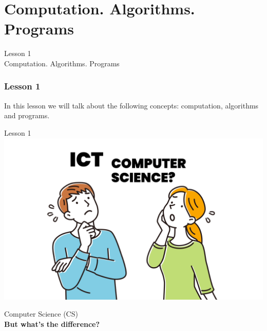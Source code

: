 \documentclass[aspectratio=1610]{beamer}
\begin{document}
\section{Computation. Algorithms. Programs}

\begin{frame}
\begin{center}
\Huge Lesson 1\\
Computation. Algorithms. Programs
\end{center}
\end{frame}


\begin{frame}
\frametitle{Lesson 1}

\Huge In this lesson we will talk about the following concepts:
 \alert{computation},
 \alert{algorithms} and
 \alert{programs}. 

\end{frame}


\begin{frame}{Lesson 1}{}
\includegraphics[scale=0.149]{Images/ictvscs.png}
\end{frame}


\begin{frame}
\begin{center}
\Huge Computer Science (CS)\\
\textbf { But what's the difference? }
\end{center}
\end{frame}
\end{document}
